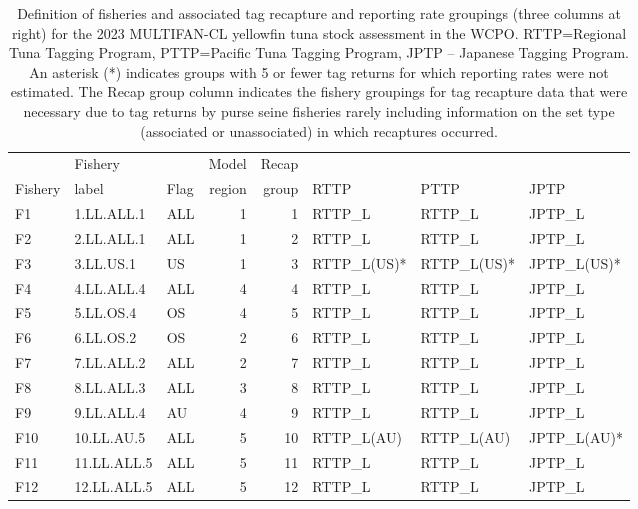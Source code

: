 \begin{table}[h]
  \centering
  \caption{\label{tab:tag_definitions} Definition of fisheries and associated tag recapture and reporting rate groupings (three columns at right) for the 2023 MULTIFAN-CL yellowfin tuna stock assessment in the WCPO. RTTP=Regional Tuna Tagging Program, PTTP=Pacific Tuna Tagging Program, JPTP -- Japanese Tagging Program. An asterisk (*) indicates groups with 5 or fewer tag returns for which reporting rates were not estimated. The Recap group column indicates the fishery groupings for tag recapture data that were necessary due to tag returns by purse seine fisheries rarely including information on the set type (associated or unassociated) in which recaptures occurred.}
  \scriptsize
  \begin{tabular}{lllrrlll}
    \hline
    ~       & Fishery &      & Model  & Recap &      &      &     \\
    Fishery & label   & Flag & region & group & RTTP & PTTP & JPTP\\
    \hline
    F1  & 1.LL.ALL.1   & ALL   & 1 &  1 & RTTP\_L          & RTTP\_L          & JPTP\_L         \\
    F2  & 2.LL.ALL.1   & ALL   & 1 &  2 & RTTP\_L          & RTTP\_L          & JPTP\_L         \\
    F3  & 3.LL.US.1    & US    & 1 &  3 & RTTP\_L(US)*     & RTTP\_L(US)*     & JPTP\_L(US)*    \\
    F4  & 4.LL.ALL.4   & ALL   & 4 &  4 & RTTP\_L          & RTTP\_L          & JPTP\_L         \\
    F5  & 5.LL.OS.4    & OS    & 4 &  5 & RTTP\_L          & RTTP\_L          & JPTP\_L         \\
    F6  & 6.LL.OS.2    & OS    & 2 &  6 & RTTP\_L          & RTTP\_L          & JPTP\_L         \\
    F7  & 7.LL.ALL.2   & ALL   & 2 &  7 & RTTP\_L          & RTTP\_L          & JPTP\_L         \\
    F8  & 8.LL.ALL.3   & ALL   & 3 &  8 & RTTP\_L          & RTTP\_L          & JPTP\_L         \\
    F9  & 9.LL.ALL.4   & AU    & 4 &  9 & RTTP\_L          & RTTP\_L          & JPTP\_L         \\
    F10 & 10.LL.AU.5   & ALL   & 5 & 10 & RTTP\_L(AU)      & RTTP\_L(AU)      & JPTP\_L(AU)*    \\
    F11 & 11.LL.ALL.5  & ALL   & 5 & 11 & RTTP\_L          & RTTP\_L          & JPTP\_L         \\
    F12 & 12.LL.ALL.5  & ALL   & 5 & 12 & RTTP\_L          & RTTP\_L          & JPTP\_L         \\

\end{tabular}
\end{table}
